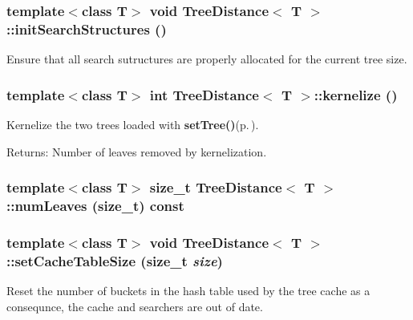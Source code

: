 \subsubsection{\setlength{\rightskip}{0pt plus 5cm}template$<$class T$>$ void {\bf Tree\-Distance}$<$ T $>$::init\-Search\-Structures ()\hspace{0.3cm}{\tt  [protected]}}\label{classTreeDistance_b1}


Ensure that all search sutructures are properly allocated for the current tree size. 

\subsubsection{\setlength{\rightskip}{0pt plus 5cm}template$<$class T$>$ int {\bf Tree\-Distance}$<$ T $>$::kernelize ()}\label{classTreeDistance_a7}


Kernelize the two trees loaded with {\bf set\-Tree()}{\rm (p.\,\pageref{classTreeDistance_a6})}. 

\begin{Desc}
\item[Returns:]Number of leaves removed by kernelization. \end{Desc}
\subsubsection{\setlength{\rightskip}{0pt plus 5cm}template$<$class T$>$ size\_\-t {\bf Tree\-Distance}$<$ T $>$::num\-Leaves (size\_\-t) const}\label{classTreeDistance_a2}


\subsubsection{\setlength{\rightskip}{0pt plus 5cm}template$<$class T$>$ void {\bf Tree\-Distance}$<$ T $>$::set\-Cache\-Table\-Size (size\_\-t {\em size})}\label{classTreeDistance_a5}


Reset the number of buckets in the hash table used by the tree cache as a consequnce, the cache and searchers are out of date. 

